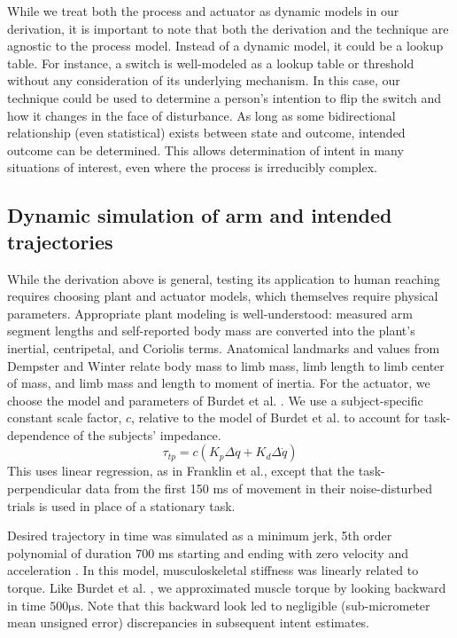 While we treat both the process and actuator as dynamic models in our derivation, it is important to note that both the derivation and the technique are agnostic to the process model. Instead of a dynamic model, it could be a lookup table. For instance, a switch is well-modeled as a lookup table or threshold without any consideration of its underlying mechanism. In this case, our technique could be used to determine a person's intention to flip the switch and how it changes in the face of disturbance. As long as some bidirectional relationship (even statistical) exists between state and outcome, intended outcome can be determined. This allows determination of intent in many situations of interest, even where the process is irreducibly complex.

\subsection*{Dynamic simulation of arm and intended trajectories}
While the derivation above is general, testing its application to human reaching requires choosing plant and actuator models, which themselves require physical parameters. Appropriate plant modeling is well-understood: measured arm segment lengths and self-reported body mass are converted into the plant's inertial, centripetal, and Coriolis terms. Anatomical landmarks and values from Dempster \cite{dempster1955space} and Winter \cite{winter2009biomechanics} relate body mass to limb mass, limb length to limb center of mass, and limb mass and length to moment of inertia. For the actuator, we choose the model and parameters of Burdet et al. \cite{burdet2006stability}. We use a subject-specific constant scale factor, $c$, relative to the model of Burdet et al. \cite{burdet2006stability} to account for task-dependence of the subjects' impedance\cite{gomi1998task}.
\begin{equation}
\tau_{tp}=c(K_p\Delta q+K_d \Delta \dot{q})
\end{equation}
This uses linear regression, as in Franklin et al.\cite{franklin2003adaptation}, except that the task-perpendicular data from the first 150 ms of movement in their noise-disturbed trials is used in place of a stationary task.  

Desired trajectory in time was simulated as a minimum jerk, 5th order polynomial of duration 700 ms starting and ending with zero velocity and acceleration \cite{flash1985coordination}.  In this  model, musculoskeletal stiffness was linearly related to torque. Like Burdet et al. \cite{burdet2006stability}, we approximated muscle torque by looking backward in time $500 \mathrm{\mu s}$. Note that this backward look led to negligible (sub-micrometer mean unsigned error) discrepancies in subsequent intent estimates. 


